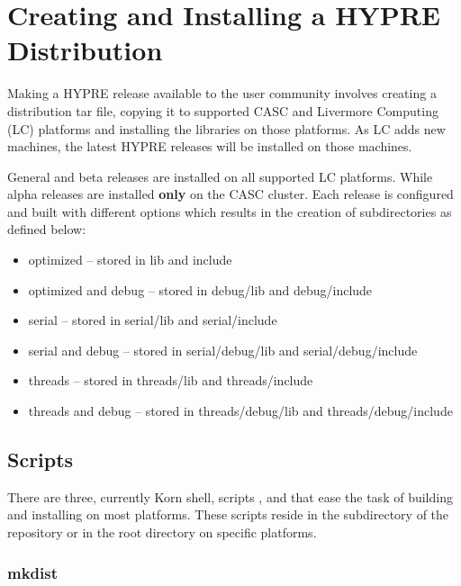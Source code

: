 \chapter{Creating and Installing a HYPRE Distribution}
\label{Creating and Installing a HYPRE Distribution}

Making a HYPRE release available to the user community involves creating a
distribution tar file, copying it to supported CASC and Livermore Computing
(LC) platforms and installing the libraries on those platforms.  As LC adds 
new machines, the latest HYPRE releases will be installed on those machines.

General and beta releases are installed on all supported LC platforms. While
alpha releases are installed {\bf only} on the CASC cluster.  Each release is 
configured and built with different options which results in the creation of 
subdirectories as defined below:
\begin{itemize}
\item optimized -- stored in lib and include
\item optimized and debug -- stored in debug/lib and debug/include

\item serial -- stored in serial/lib and serial/include
\item serial and debug -- stored in serial/debug/lib and serial/debug/include

\item threads -- stored in threads/lib and threads/include
\item threads and debug -- stored in threads/debug/lib and threads/debug/include
\end{itemize}

\section{Scripts}
\label{Scripts}

There are three, currently Korn shell, scripts , 
and  that ease the task of building and installing \hypre{} on most 
platforms.  These scripts reside in the  subdirectory of the \hypre{} 
repository or in the root directory on specific platforms.

\subsection{mkdist}
\label{mkdist}

